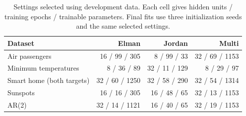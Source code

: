 \begin{table}[t]
\centering
\small
\caption{Settings selected using development data. Each cell gives hidden units / training epochs / trainable parameters. Final fits use three initialization seeds and the same selected settings.}
\label{tab:final-settings}
\begin{tabular}{lrrr}
\toprule
Dataset & Elman & Jordan & Multi \\
\midrule
Air passengers & 16 / 99 / 305 & 8 / 99 / 33 & 32 / 69 / 1153 \\
Minimum temperatures & 8 / 36 / 89 & 32 / 11 / 129 & 8 / 29 / 97 \\
Smart home (both targets) & 32 / 60 / 1250 & 32 / 58 / 290 & 32 / 54 / 1314 \\
Sunspots & 16 / 16 / 305 & 16 / 48 / 65 & 32 / 13 / 1153 \\
AR(2) & 32 / 14 / 1121 & 16 / 40 / 65 & 32 / 19 / 1153 \\
\bottomrule
\end{tabular}
\end{table}
